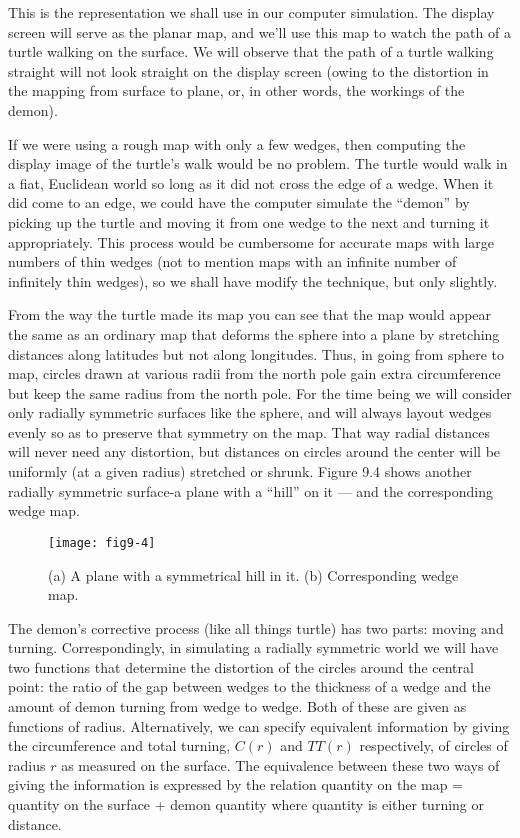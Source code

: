 \documentclass{book}
\begin{document}
This is the representation we shall use in our computer simulation.
The display screen will serve as the planar map, and we'll use this map
to watch the path of a turtle walking on the surface. We will observe
that the path of a turtle walking straight will not look straight on the
display screen (owing to the distortion in the mapping from surface to
plane, or, in other words, the workings of the demon).

If we were using a rough map with only a few wedges, then computing
the display image of the turtle's walk would be no problem. The turtle
would walk in a fiat, Euclidean world so long as it did not cross the edge
of a wedge. When it did come to an edge, we could have the computer
simulate the ``demon'' by picking up the turtle and moving it from one
wedge to the next and turning it appropriately. This process would be
cumbersome for accurate maps with large numbers of thin wedges (not
to mention maps with an infinite number of infinitely thin wedges), so
we shall have modify the technique, but only slightly.

From the way the turtle made its map you can see that the map would
appear the same as an ordinary map that deforms the sphere into a plane
by stretching distances along latitudes but not along longitudes. Thus,
in going from sphere to map, circles drawn at various radii from the
north pole gain extra circumference but keep the same radius from the
north pole. For the time being we will consider only radially symmetric
surfaces like the sphere, and will always layout wedges evenly so as
to preserve that symmetry on the map. That way radial distances will
never need any distortion, but distances on circles around the center will
be uniformly (at a given radius) stretched or shrunk. Figure 9.4 shows
another radially symmetric surface-a plane with a ``hill'' on it --- and
the corresponding wedge map.

\begin{figure}
\begin{center}
\texttt{[image: fig9-4]}
\caption{(a) A plane with a symmetrical hill in it. (b) Corresponding wedge map.}
\end{center}
\end{figure}

The demon's corrective process (like all things turtle) has two parts:
moving and turning. Correspondingly, in simulating a radially symmetric world we will have two functions that determine the distortion of
the circles around the central point: the ratio of the gap between wedges
to the thickness of a wedge and the amount of demon turning from wedge
to wedge. Both of these are given as functions of radius. Alternatively,
we can specify equivalent information by giving the circumference and
total turning, $C(r)$ and $TT(r)$ respectively, of circles of radius $r$ as
measured on the surface. The equivalence between these two ways of
giving the information is expressed by the relation
quantity on the map = quantity on the surface + demon quantity
where quantity is either turning or distance.
\end{document}
